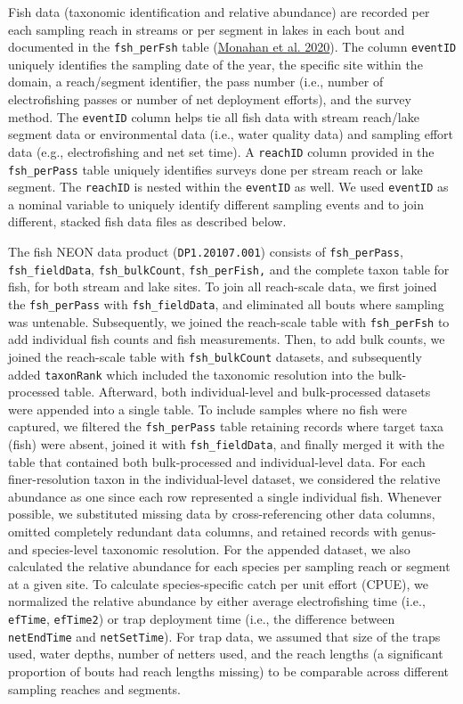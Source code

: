 \documentclass[
  12pt,
]{article}
\begin{document}
Fish data (taxonomic identification and relative abundance) are recorded per each sampling reach in streams or per segment in lakes in each bout and documented in the \texttt{fsh\_perFsh} table (\protect\hyperlink{ref-Monahan2020}{Monahan et al. 2020}). The column \texttt{eventID} uniquely identifies the sampling date of the year, the specific site within the domain, a reach/segment identifier, the pass number (i.e., number of electrofishing passes or number of net deployment efforts), and the survey method. The \texttt{eventID} column helps tie all fish data with stream reach/lake segment data or environmental data (i.e., water quality data) and sampling effort data (e.g., electrofishing and net set time). A \texttt{reachID} column provided in the \texttt{fsh\_perPass} table uniquely identifies surveys done per stream reach or lake segment. The \texttt{reachID} is nested within the \texttt{eventID} as well. We used \texttt{eventID} as a nominal variable to uniquely identify different sampling events and to join different, stacked fish data files as described below.

The fish NEON data product (\texttt{DP1.20107.001}) consists of \texttt{fsh\_perPass}, \texttt{fsh\_fieldData}, \texttt{fsh\_bulkCount}, \texttt{fsh\_perFish,} and the complete taxon table for fish, for both stream and lake sites. To join all reach-scale data, we first joined the \texttt{fsh\_perPass} with \texttt{fsh\_fieldData}, and eliminated all bouts where sampling was untenable. Subsequently, we joined the reach-scale table with \texttt{fsh\_perFsh} to add individual fish counts and fish measurements. Then, to add bulk counts, we joined the reach-scale table with \texttt{fsh\_bulkCount} datasets, and subsequently added \texttt{taxonRank} which included the taxonomic resolution into the bulk-processed table. Afterward, both individual-level and bulk-processed datasets were appended into a single table. To include samples where no fish were captured, we filtered the \texttt{fsh\_perPass} table retaining records where target taxa (fish) were absent, joined it with \texttt{fsh\_fieldData}, and finally merged it with the table that contained both bulk-processed and individual-level data. For each finer-resolution taxon in the individual-level dataset, we considered the relative abundance as one since each row represented a single individual fish. Whenever possible, we substituted missing data by cross-referencing other data columns, omitted completely redundant data columns, and retained records with genus- and species-level taxonomic resolution. For the appended dataset, we also calculated the relative abundance for each species per sampling reach or segment at a given site. To calculate species-specific catch per unit effort (CPUE), we normalized the relative abundance by either average electrofishing time (i.e., \texttt{efTime}, \texttt{efTime2}) or trap deployment time (i.e., the difference between \texttt{netEndTime} and \texttt{netSetTime}). For trap data, we assumed that size of the traps used, water depths, number of netters used, and the reach lengths (a significant proportion of bouts had reach lengths missing) to be comparable across different sampling reaches and segments.
\end{document}
